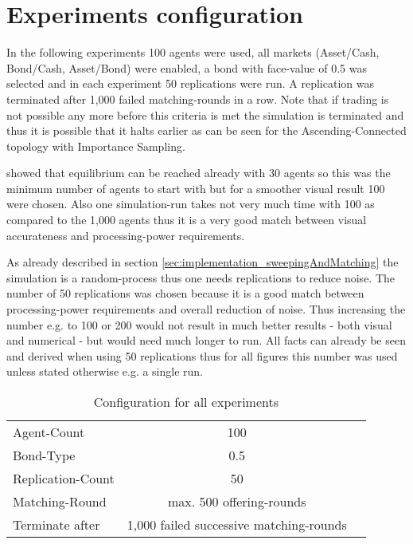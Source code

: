 \documentclass[Bachelorarbeit.tex]{subfiles}
\begin{document}
\section{Experiments configuration}
In the following experiments 100 agents were used, all markets (Asset/Cash, Bond/Cash, Asset/Bond) were enabled, a bond with face-value of 0.5 was selected and in each experiment 50 replications were run. A replication was terminated after 1,000 failed matching-rounds in a row. Note that if trading is not possible any more before this criteria is met the simulation is terminated and thus it is possible that it halts earlier as can be seen for the Ascending-Connected topology with Importance Sampling.

\bigskip 

\cite{Breuer2015} showed that equilibrium can be reached already with 30 agents so this was the minimum number of agents to start with but for a smoother visual result 100 were chosen. Also one simulation-run takes not very much time with 100 as compared to the 1,000 agents thus it is a very good match between visual accurateness and processing-power requirements.

\medskip

As already described in section \ref{sec:implementation_sweepingAndMatching} the simulation is a random-process thus one needs replications to reduce noise. The number of 50 replications was chosen because it is a good match between processing-power requirements and overall reduction of noise. Thus increasing the number e.g. to 100 or 200 would not result in much better results - both visual and numerical - but would need much longer to run. All facts can already be seen and derived when using 50 replications thus for all figures this number was used unless stated otherwise e.g. a single run.

\begin{table}[H]
	\centering
	\caption{Configuration for all experiments}
	\begin{tabular} { l c r }
		\hline
		Agent-Count & 100 \\
		Bond-Type & 0.5 \\
		Replication-Count & 50 \\
		Matching-Round & max. 500 offering-rounds \\
		Terminate after & 1,000 failed successive matching-rounds \\
		\hline
	\end{tabular}
\end{table}
\end{document}

